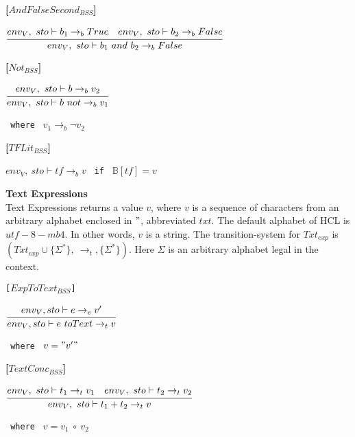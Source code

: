 \textbf{[$AndFalseSecond_{BSS}$]}
\begin{center}
	\begin{math}
	\cfrac
	{env_V,\ sto \vdash b_1 \rightarrow_b True \quad env_V,\ sto \vdash b_2 \rightarrow_b False}
	{env_V,\ sto \vdash b_1\ and\ b_2 \rightarrow_b False}
	\end{math}
\end{center}

\textbf{[$Not_{BSS}$]}
\begin{center}
	\begin{math}
	\cfrac
	{env_V,\ sto \vdash b \rightarrow_b v_2}
	{env_V,\ sto \vdash b\ not \rightarrow_b v_1}
	\end{math}
	
	\texttt{ where } $v_1 \rightarrow_b \neg v_2$
\end{center}

\textbf{[$TFLit_{BSS}$]}
\begin{center}
	\begin{math}
	env_V,\ sto \vdash tf \rightarrow_b v
	\end{math}
	\texttt{ if } $\mathbb{B}[tf] = v$
\end{center}

\textbf{\large{Text Expressions}}\\
Text Expressions returns a value $v$, where $v$ is a sequence of characters from an arbitrary alphabet enclosed in $"$, abbreviated $txt$.
The default alphabet of HCL is $utf-8-mb4$.
In other words, $v$ is a string.
The transition-system for $Txt_{exp}$ is $(Txt_{exp} \cup \{\Sigma^*\},\ \rightarrow_t, \{\Sigma^*\})$.
Here $\Sigma$ is an arbitrary alphabet legal in the context.

\texttt{[$ExpToText_{BSS}$]}
\begin{center}
	\begin{math}
	\cfrac
	{env_V, sto \vdash e \rightarrow_{e} v'}
	{env_V, sto \vdash e\ toText \rightarrow_{t} v}
	\end{math}
	
	\texttt{ where } $v = "v'"$
\end{center}

\textbf{[$TextConc_{BSS}$]}
\begin{center}
	\begin{math}
	\cfrac
		{env_V,\ sto \vdash t_1 \rightarrow_t v_1 \quad env_V,\ sto \vdash t_2 \rightarrow_t v_2}
		{env_V,\ sto \vdash t_1 + t_2 \rightarrow_t v}
	\end{math}
	
	\texttt{ where } $v = v_1\ \circ\ v_2$
\end{center}

